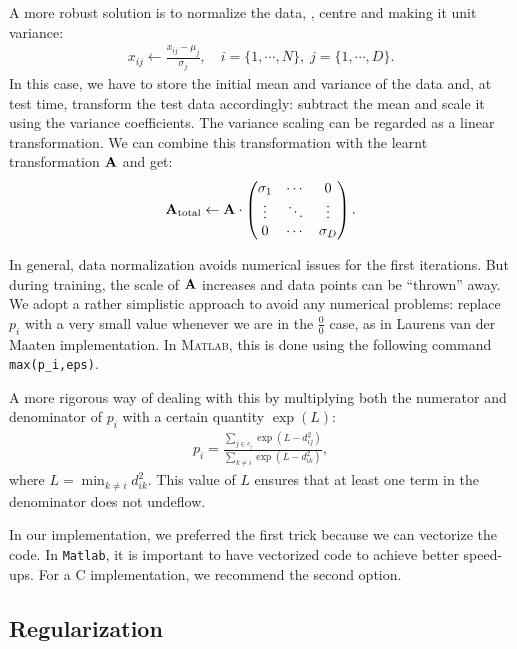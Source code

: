 	A more robust solution is to normalize the
        data, \ie, centre and making it unit variance:
        \begin{align}
            x_{ij} \leftarrow \frac{x_{ij} - \mu_j}{\sigma_j}, \quad i =
	    \{1,\cdots,N\},\; j = \{1,\cdots,D\}.
        \end{align}
        In this case, we have to store the initial mean and variance of the data
        and, at test time, transform the test data accordingly: subtract the mean and scale it using the variance coefficients. The variance scaling can be regarded as a linear transformation. We can combine this transformation with the learnt transformation $\mathbf{A}$ and get:
        \begin{align}
            \mathbf{A}_{\text{total}} \leftarrow \mathbf{A}  \cdot \begin{pmatrix}
                  \sigma_1 &  \cdots & 0 \\
                  \vdots  &   \ddots & \vdots  \\
                  0 & \cdots & \sigma_D
                 \end{pmatrix}.
        \end{align}

	
	In general, data normalization avoids numerical issues for the first iterations. But during training, the scale of $\mathbf{A}$ increases and data points can be ``thrown'' away. We adopt a rather simplistic approach to avoid any numerical problems: replace $p_i$ with a very small value whenever we are in the $\frac{0}{0}$ case, as in Laurens van der Maaten implementation. In \textsc{Matlab}, this is done using the following command \texttt{max(p\_i,eps)}. 
    
	A more rigorous way of dealing with this by multiplying both the numerator and denominator of $p_i$ with a certain quantity $\exp(L)$:
	\begin{align}
	  p_i = \frac{\sum_{j\in c_i} \exp(L-d_{ij}^2)}{\sum_{k\neq i} \exp(L-d_{ik}^2)},
	\end{align}
	where $L = \min_{k\neq i} d_{ik}^2$. This value of $L$ ensures that at least one term in the denominator does not undeflow.

	In our implementation, we preferred the first trick because we can vectorize the code. In \texttt{Matlab}, it is important to have vectorized code to achieve better speed-ups. For a C implementation, we recommend the second option.

\subsection{Regularization}
\label{subsec:regularization}

